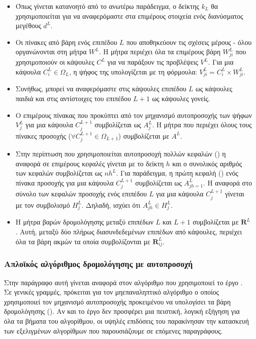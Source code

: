 \begin{itemize}
  \item Όπως γίνεται κατανοητό από το ανωτέρω παράδειγμα, ο δείκτης $k_L$ θα χρησιμοποιείται για να αναφερόμαστε στα επιμέρους στοιχεία ενός διανύσματος μεγέθους $d^L$.
  \item Οι πίνακες από βάρη ενός επιπέδου $L$ που αποθηκεύουν τις σχέσεις μέρους - όλου οργανώνονται στη μήτρα $W^L$. Η μήτρα περιέχει όλα τα επιμέρους βάρη $W_{ji}^L$ που χρησιμοποιούν οι κάψουλες $C^L$ για να παράξουν τις προβλέψεις $V^L$. Για μια κάψουλα $C_i^L \in \Omega_L$, η ψήφος της υπολογίζεται με τη φόρμουλα: $V_{ji}^L = C_i^L \times W_{ji}^L$.
  \item Συνήθως, μπορεί να αναφερόμαστε στις κάψουλες επιπέδου $L$ ως κάψουλες παιδιά και στις αντίστοιχες του επιπέδου $L+1$ ως κάψουλες γονείς.
  \item Ο επιμέρους πίνακας που προκύπτει από τον μηχανισμό αυτο\textendash προσοχής των ψήφων $V^L_j$ για μια κάψουλα $C_j^{L+1}$ συμβολίζεται ως $Α^L_j$. Η μήτρα που περιέχει όλους τους πίνακες προσοχής ($\forall C_j^{L+1} \in \Omega_{L+1}$) συμβολίζεται με $A^L$.
  \item Στην περίπτωση που χρησιμοποιείται αυτο\textendash προσοχή πολλών κεφαλών () η αναφορά σε επιμέρους κεφαλές γίνεται με το δείκτη $h$ και ο συνολικός αριθμός των κεφαλών συμβολίζεται ως $nh^L$. Για παράδειγμα, η πρώτη κεφαλή () ενός πίνακα προσοχής για μια κάψουλα $C^{L+1}_j$ συμβολίζεται ως $A_{jh=1}^L$. Η αναφορά στο σύνολο των κεφαλών προσοχής ενός επιπέδου $L$ για μια κάψουλα $C_j^{L+1}$ γίνεται με τον συμβολισμό $H_j^L$. Δηλαδή, ισχύει ότι $A_{jh}^L \in H_j^L$.
  \item Η μήτρα βαρών δρομολόγησης μεταξύ επιπέδων $L$ και $L + 1$ συμβολίζεται με $\mathbf{R}^L$. Αυτή, μεταξύ δύο πλήρως διασυνδεδεμένων επιπέδων από κάψουλες, περιέχει όλα τα βάρη ακμών τα οποία συμβολίζονται με $\mathbf{R}_{ij}^L$.
\end{itemize}


\subsubsection{Απλοϊκός αλγόριθμος δρομολόγησης με αυτο\textendash προσοχή}

Στην παράγραφο αυτή γίνεται αναφορά στον αλγόριθμο που χρησιμοποιεί το έργο \cite{mazzia2021efficient}. Σε γενικές γραμμές, πρόκειται για τον μη\textendash επαναληπτικό αλγόριθμο ο οποίος χρησιμοποιεί τον μηχανισμό αυτο\textendash προσοχής προκειμένου να υπολογίσει τα βάρη δρομολόγησης (). Αν και το έργο δεν προσφέρει μια πειστική, λογική εξήγηση για όλα τα βήματα του αλγορίθμου, οι υψηλές επιδόσεις του παρακίνησαν την κατασκευή των εξελιγμένων αλγορίθμων που παρουσιάζουμε σε επόμενες παραγράφους.\par

